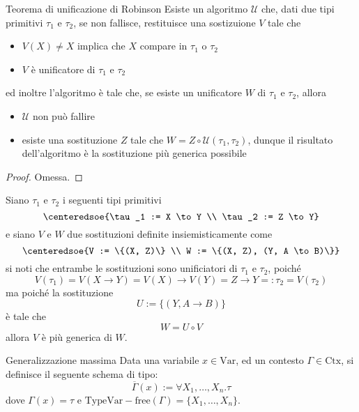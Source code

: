 \documentclass[a4paper, 12pt]{report}
\begin{document}
    \begin{framedthm}[label={robinson}]{Teorema di unificazione di Robinson}
        Esiste un algoritmo $\mathcal U$  che, dati due tipi primitivi $\tau_1$ e $\tau_2$, se non fallisce, restituisce una sostizuione $V$ tale che

        \begin{itemize}
            \item $V(X) \neq X$ implica che $X$ compare in $\tau_1$ o $\tau_2$
            \item $V$ è unificatore di $\tau_1$ e $\tau_2$
        \end{itemize}

        ed inoltre l'algoritmo è tale che, se esiste un unificatore $W$ di $\tau_1$ e $\tau_2$, allora

        \begin{itemize}
            \item $\mathcal U$ non può fallire
            \item esiste una sostituzione $Z$ tale che $W = Z \circ \mathcal U(\tau_1, \tau_2)$, dunque il risultato dell'algoritmo è la sostituzione più generica possibile
        \end{itemize}
    \end{framedthm}

    \begin{proof}
        Omessa.
    \end{proof}

    \begin{example}
    Siano $\tau_1$ e $\tau_2$ i seguenti tipi primitivi $$\centeredsoe{\tau_1 := X \to Y \\ \tau_2 := Z \to Y}$$ e siano $V$ e $W$ due sostituzioni definite insiemisticamente come $$\centeredsoe{V := \{(X, Z)\} \\ W := \{(X, Z), (Y, A \to B)\}}$$ si noti che entrambe le sostituzioni sono unificiatori di $\tau_1$ e $\tau_2$, poiché $$V(\tau_1) = V(X \to Y) = V(X) \to V(Y) = Z \to Y =: \tau_2 = V(\tau_2)$$  ma poiché la sostituzione $$U := \{(Y, A \to B)\}$$ è tale che $$W = U \circ V$$ allora $V$ è più generica di $W$.
    \end{example}

    \begin{frameddefn}{Generalizzazione massima}
        Data una variabile $x \in \mathrm{Var}$, ed un contesto $\Gamma \in \mathrm{Ctx}$, si definisce  il seguente schema di tipo: $$\overline \Gamma (x) := \forall X_1, \ldots, X_n . \tau$$ dove $\Gamma(x) = \tau$ e $\mathrm{TypeVar} - \mathrm{free}(\Gamma) = \{ X_1, \ldots, X_n \}$.
    \end{frameddefn}
\end{document}
